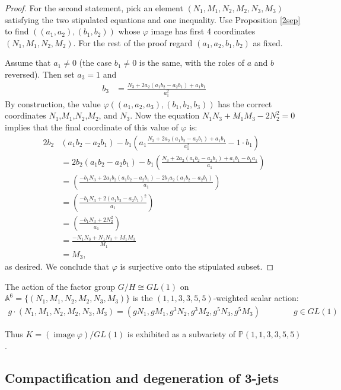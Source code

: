 \documentclass[12pt]{article}
\numberwithin{equation}{section}
\theoremstyle{plain}
\theoremstyle{definition}
\renewcommand{\P}{\mathbb{P}}
\newcommand{\GL}{GL}
\newcommand{\A}{\mathbb{A}}
\begin{document}
\begin{proof}
For the second statement, pick an element $(N_1,M_1,N_2,M_2,N_3,M_3)$ satisfying the two stipulated equations and one inequality. Use Proposition \ref{2sep} to find $((a_1,a_2),(b_1,b_2))$ whose $\varphi$ image has first 4 coordinates $(N_1,M_1,N_2,M_2)$. For the rest of the proof regard $(a_1,a_2,b_1,b_2)$ as fixed.

Assume that $a_1\neq 0$ (the case $b_1\neq 0$ is the same, with the roles of $a$ and $b$ reversed). Then set $a_3=1$ and
\begin{align*}
b_3 &= \frac{N_3+2a_2(a_1b_2-a_2b_1)+a_1b_1}{a_1^{2}}
\end{align*}
By construction, the value $\varphi((a_1,a_2,a_3),(b_1,b_2,b_3))$ has the correct coordinates $N_1$,$M_1$,$N_2$,$M_2$, and $N_3$. Now the equation $N_1N_3+M_1M_3-2N_2^2=0$ implies that the final coordinate of this value of $\varphi$ is:
\begin{align*}
2b_2&(a_{1}b_{2}-a_2b_{1}) -  b_{1}\left(a_{1}\frac{N_3+2a_2(a_1b_2-a_2b_1)+a_1b_1}{a_1^{2}}-1\cdot b_{1}\right)\\
&= 2b_2(a_{1}b_{2}-a_2b_{1}) -  b_{1}\left(\frac{N_3+2a_2(a_1b_2-a_2b_1)+a_1b_1-b_1a_1}{a_1}\right)\\
&= \left(\frac{-b_1N_3+2a_{1}b_2(a_{1}b_{2}-a_2b_{1})-2b_{1}a_2(a_1b_2-a_2b_1)}{a_1}\right) \\
&= \left(\frac{-b_1N_3+2(a_{1}b_{2}-a_2b_{1})^{2}}{a_1}\right) \\
&= \left(\frac{-b_1N_3+2N_2^{2}}{a_1}\right) \\
&= \frac{-N_1N_3+N_1N_3+M_1M_3}{M_1}\\
&= M_3,
\end{align*}
as desired. We conclude that $\varphi$ is surjective onto the stipulated subset.
\end{proof}
The action of the factor group $G/H\cong \GL(1)$ on $\A^{6}=\{(N_1,M_1,N_2,M_2,N_3,M_3)\}$ is the $(1,1,3,3,5,5)$-weighted scalar action:
\begin{align*}
g\cdot (N_1,M_1,N_2,M_2,N_3,M_3) = (gN_1,gM_1,g^3N_2,g^3M_2,g^{5}N_3,g^{5}M_3)\qquad\qquad g\in \GL(1)
\end{align*}

Thus $K=(\operatorname{image}\varphi) / \GL(1)$ is exhibited as a subvariety of $\P(1,1,3,3,5,5)$.

\subsection{Compactification and degeneration of 3-jets}
\end{document}
